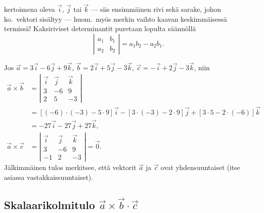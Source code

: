 kertoimena oleva $\vec i$, $\vec j$ tai $\vec k$ --- siis ensimmäinen rivi sekä sarake, 
johon ko.\ vektori sisältyy --- huom.\ myös merkin vaihto kaavan keskimmäisessä termissä!
Kaksiriviset determinantit puretaan lopulta säännöllä
\[
\left|\begin{array}{cc} 
a_1 & b_1 \\
a_2 & b_2
\end{array} \right| = a_1b_2 - a_2b_1.
\]
\begin{Exa} Jos $\vec a = 3\vec i -6\vec j + 9\vec k$, $\vec b = 2\vec i + 5\vec j - 3\vec k$, 
$\vec c = -\vec i + 2\vec j - 3\vec k$, niin
\begin{align*}
\vec a \times \vec b &= \left| \begin{array}{rrr} \vec i & \vec j & \vec k \\ 3 & -6 & 9 \\ 
                                                          2 & 5 & -3 \end{array} \right| \\
                     &= [(-6)\cdot(-3)-5\cdot 9]\vec i - [3\cdot(-3)-2\cdot 9]\vec j 
                                                       + [3\cdot 5 -2\cdot(-6)]\vec k \\
                     &= -27\vec i -27\vec j + 27\vec k, \\
\vec a \times \vec c &= \left|\begin{array}{rrr} \vec i & \vec j & \vec k \\ 3&-6&9 \\
                                                -1&2&-3 \end{array}\right| = \vec 0. 
\end{align*}
Jälkimmäinen tulos merkitsee, että vektorit $\vec a$ ja $\vec c$ ovat yhdensuuntaiset (itse 
asiassa vastakkaissuuntaiset). \loppu
\end{Exa}

\subsection{Skalaarikolmitulo $\vec a\times\vec b\cdot\vec c$}


